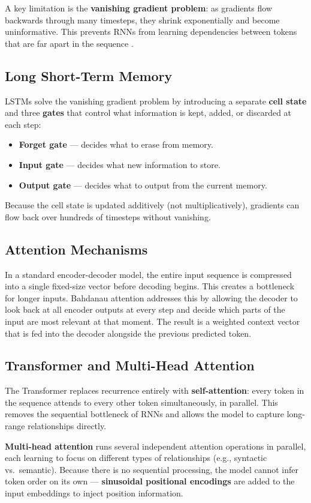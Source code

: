 A key limitation is the \textbf{vanishing gradient problem}: as gradients flow
backwards through many timesteps, they shrink exponentially and become
uninformative. This prevents RNNs from learning dependencies between tokens that
are far apart in the sequence \cite{bengio1994}.

\subsection{Long Short-Term Memory}

LSTMs \cite{hochreiter1997} solve the vanishing gradient problem by introducing
a separate \textbf{cell state} and three \textbf{gates} that control what
information is kept, added, or discarded at each step:

\begin{itemize}
    \item \textbf{Forget gate} — decides what to erase from memory.
    \item \textbf{Input gate} — decides what new information to store.
    \item \textbf{Output gate} — decides what to output from the current memory.
\end{itemize}

Because the cell state is updated additively (not multiplicatively), gradients
can flow back over hundreds of timesteps without vanishing.

\subsection{Attention Mechanisms}

In a standard encoder-decoder model, the entire input sequence is compressed
into a single fixed-size vector before decoding begins. This creates a bottleneck
for longer inputs. Bahdanau attention \cite{bahdanau2015} addresses this by
allowing the decoder to look back at all encoder outputs at every step and decide
which parts of the input are most relevant at that moment. The result is a
weighted context vector that is fed into the decoder alongside the previous
predicted token.

\subsection{Transformer and Multi-Head Attention}

The Transformer \cite{vaswani2017} replaces recurrence entirely with
\textbf{self-attention}: every token in the sequence attends to every other token
simultaneously, in parallel. This removes the sequential bottleneck of RNNs and
allows the model to capture long-range relationships directly.

\textbf{Multi-head attention} runs several independent attention operations in
parallel, each learning to focus on different types of relationships (e.g.,
syntactic vs.\ semantic). Because there is no sequential processing, the model
cannot infer token order on its own — \textbf{sinusoidal positional encodings}
are added to the input embeddings to inject position information.
